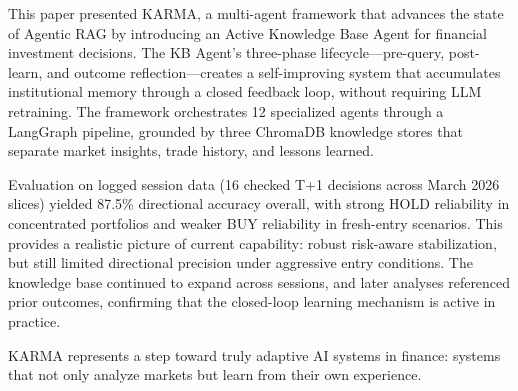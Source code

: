 \documentclass[conference]{IEEEtran}
\begin{document}
This paper presented KARMA, a multi-agent framework that advances the state of Agentic RAG by introducing an Active Knowledge Base Agent for financial investment decisions. The KB Agent's three-phase lifecycle---pre-query, post-learn, and outcome reflection---creates a self-improving system that accumulates institutional memory through a closed feedback loop, without requiring LLM retraining. The framework orchestrates 12 specialized agents through a LangGraph pipeline, grounded by three ChromaDB knowledge stores that separate market insights, trade history, and lessons learned.

Evaluation on logged session data (16 checked T+1 decisions across March 2026 slices) yielded 87.5\% directional accuracy overall, with strong HOLD reliability in concentrated portfolios and weaker BUY reliability in fresh-entry scenarios. This provides a realistic picture of current capability: robust risk-aware stabilization, but still limited directional precision under aggressive entry conditions. The knowledge base continued to expand across sessions, and later analyses referenced prior outcomes, confirming that the closed-loop learning mechanism is active in practice.

KARMA represents a step toward truly adaptive AI systems in finance: systems that not only analyze markets but learn from their own experience.

\end{document}
